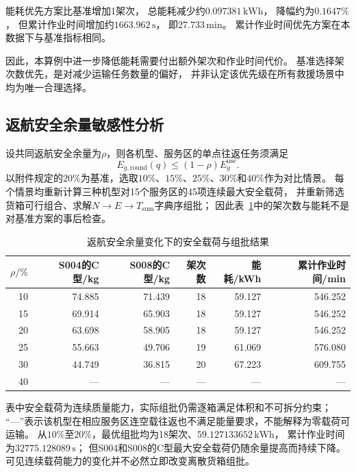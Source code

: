 \documentclass[bwprint]{gmcmthesis}
\begin{document}
能耗优先方案比基准增加1架次，
总能耗减少约$0.097381\,\mathrm{kWh}$，
降幅约为$0.1647\%$，
但累计作业时间增加约$1663.962\,\mathrm{s}$，
即$27.733\,\mathrm{min}$。
累计作业时间优先方案在本数据下与基准指标相同。

因此，本算例中进一步降低能耗需要付出额外架次和作业时间代价。
基准选择架次数优先，是对减少运输任务数量的偏好，
并非认定该优先级在所有救援场景中均为唯一合理选择。

\subsection{返航安全余量敏感性分析}

设共同返航安全余量为$\rho$，则各机型、服务区的单点往返任务须满足
\begin{equation}
    E_{g,\mathrm{round}}(q)\leq (1-\rho)E_g^{\mathrm{use}}.
\end{equation}
以附件规定的$20\%$为基准，选取$10\%$、$15\%$、$25\%$、$30\%$和$40\%$作为对比情景。
每个情景均重新计算三种机型对15个服务区的45项连续最大安全载荷，
并重新筛选货箱可行组合、求解$N\rightarrow E\rightarrow T_{\mathrm{sum}}$字典序组批；
因此表~\ref{tab:q1_reserve_sensitivity}中的架次数与能耗不是对基准方案的事后检查。

\begin{table}[htbp]
    \centering
    \caption{返航安全余量变化下的安全载荷与组批结果}
    \label{tab:q1_reserve_sensitivity}
    \begin{tabular}{rrrrrr}
        \toprule
        $\rho/\%$ & S004的C型/kg & S008的C型/kg & 架次数 & 能耗/kWh & 累计作业时间/min \\
        \midrule
10 & 74.885 & 71.439 & 18 & 59.127 & 546.252 \\
15 & 69.914 & 65.903 & 18 & 59.127 & 546.252 \\
20 & 63.698 & 58.905 & 18 & 59.127 & 546.252 \\
25 & 55.663 & 49.706 & 19 & 61.069 & 576.080 \\
30 & 44.749 & 36.815 & 20 & 67.223 & 609.755 \\
40 & --- & --- & --- & --- & --- \\
        \bottomrule
    \end{tabular}
\end{table}
\FloatBarrier

表中安全载荷为连续质量能力，实际组批仍需逐箱满足体积和不可拆分约束；
“---”表示该机型在相应服务区连空载往返也不满足能量要求，不能解释为零载荷可运输。
从$10\%$至$20\%$，最优组批均为18架次、$59.127133652\,\mathrm{kWh}$，
累计作业时间为$32775.128089\,\mathrm{s}$；
但S004和S008的C型最大安全载荷仍随余量提高而持续下降。
可见连续载荷能力的变化并不必然立即改变离散货箱组批。
\end{document}
